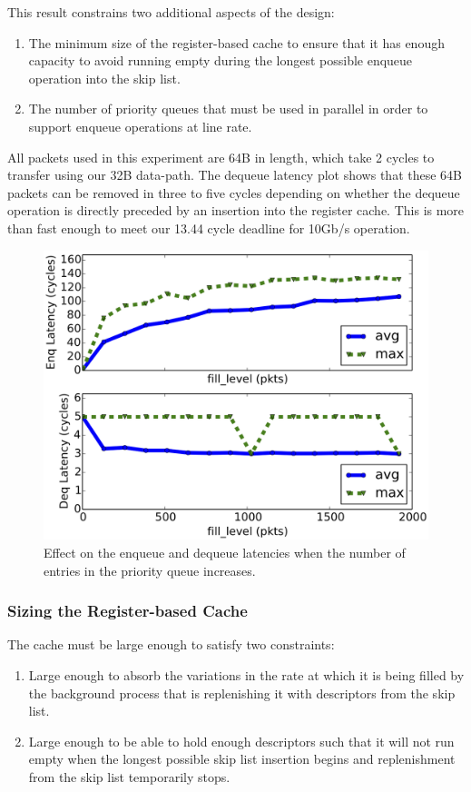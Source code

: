 This result constrains two additional aspects of the design:
\begin{enumerate}
  \item The minimum size of the register-based cache to ensure that it has enough capacity to avoid running empty during the longest possible enqueue operation into the skip list.
    \item The number of priority queues that must be used in parallel in order to support enqueue operations at line rate.
\end{enumerate}

All packets used in this experiment are 64B in length, which take 2 cycles to transfer using our 32B data-path. The dequeue latency plot shows that these 64B packets can be removed in three to five cycles depending on whether the dequeue operation is directly preceded by an insertion into the register cache. This is more than fast enough to meet our 13.44 cycle deadline for 10Gb/s operation.

\begin{figure}[!h]
\includegraphics[width=1\linewidth]{figures/eval/enq_deq_v_fill_level}
\caption{Effect on the enqueue and dequeue latencies when the number of entries in the priority queue increases.}
\label{fig:fill_level}
\end{figure}

\subsubsection*{Sizing the Register-based Cache}
The cache must be large enough to satisfy two constraints:
\begin{enumerate}
  \item Large enough to absorb the variations in the rate at which it is being filled by the background process that is replenishing it with descriptors from the skip list.
  \item Large enough to be able to hold enough descriptors such that it will not run empty when the longest possible skip list insertion begins and replenishment from the skip list temporarily stops.
\end{enumerate}

